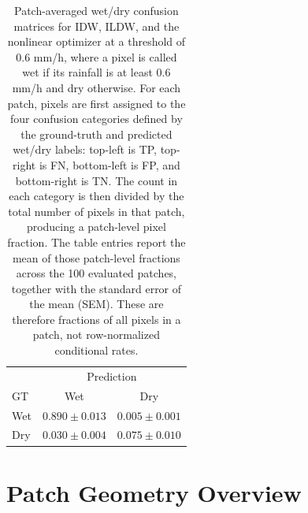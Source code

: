 \documentclass[11pt]{article}
\begin{document}
\begin{table}[H]
\begin{minipage}[t]{0.31\textwidth}
    \vspace{0.35em}
    \scriptsize
    \begin{tabular}{lcc}
      \toprule
       & \multicolumn{2}{c}{Prediction} \\
      GT & Wet & Dry \\
      \midrule
      Wet & $0.890 \pm 0.013$ & $0.005 \pm 0.001$ \\
      Dry & $0.030 \pm 0.004$ & $0.075 \pm 0.010$ \\
      \bottomrule
    \end{tabular}
  \end{minipage}
  \caption{Patch-averaged wet/dry confusion matrices for IDW, ILDW, and the nonlinear optimizer at a threshold of $0.6$ mm/h, where a pixel is called wet if its rainfall is at least $0.6$ mm/h and dry otherwise. For each patch, pixels are first assigned to the four confusion categories defined by the ground-truth and predicted wet/dry labels: top-left is TP, top-right is FN, bottom-left is FP, and bottom-right is TN. The count in each category is then divided by the total number of pixels in that patch, producing a patch-level pixel fraction. The table entries report the mean of those patch-level fractions across the 100 evaluated patches, together with the standard error of the mean (SEM). These are therefore fractions of all pixels in a patch, not row-normalized conditional rates.}
\end{table}


\section*{Patch Geometry Overview}


\end{document}
